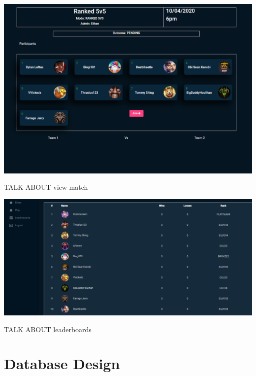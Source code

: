 \begin{center}    
	\includegraphics[width=\textwidth,height=\textheight,keepaspectratio]{img/ViewMatch.png}
\end{center}
TALK ABOUT view match

\begin{center}    
	\includegraphics[width=\textwidth,height=\textheight,keepaspectratio]{img/Leaderboards.png}
\end{center}
TALK ABOUT leaderboards

\newpage
\section{Database Design}

